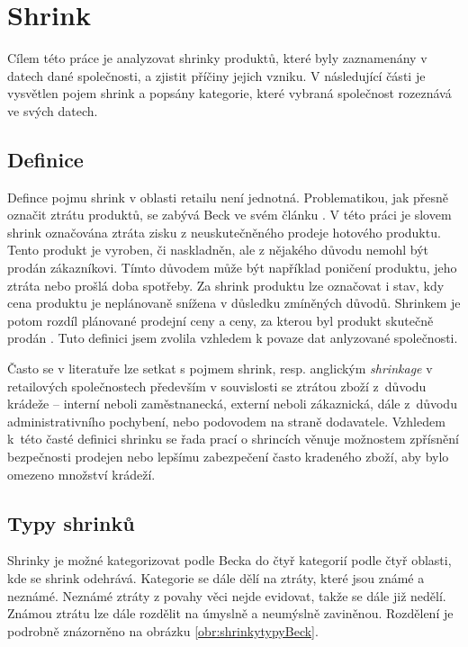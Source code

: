 \chapter{Shrink}
\label{ch:shrinky}

Cílem této práce je analyzovat shrinky produktů, které byly zaznamenány v datech dané společnosti, a zjistit příčiny jejich vzniku. V následující části je vysvětlen pojem shrink a popsány kategorie, které vybraná společnost rozeznává ve svých datech.

\section{Definice}

Defince pojmu shrink v oblasti retailu není jednotná. Problematikou, jak přesně označit ztrátu produktů, se zabývá Beck ve svém článku \cite{bib:shrink2}. V této práci je slovem shrink označována ztráta zisku z neuskutečněného prodeje hotového produktu. Tento produkt je vyroben, či naskladněn, ale z nějakého důvodu nemohl být prodán zákazníkovi. Tímto důvodem může být například poničení produktu, jeho ztráta nebo prošlá doba spotřeby. Za shrink produktu lze označovat i stav, kdy cena produktu je neplánovaně snížena v důsledku zmíněných důvodů. Shrinkem je potom rozdíl plánované prodejní ceny a ceny, za kterou byl produkt skutečně prodán \cite{bib:DefShrink}. Tuto definici jsem zvolila vzhledem k povaze dat anlyzované společnosti.

Často se v literatuře lze setkat s pojmem shrink, resp. anglickým \emph{shrinkage} v retailových společnostech především v souvislosti se ztrátou zboží z~důvodu krádeže -- interní neboli zaměstnanecká, externí neboli zákaznická, dále z~důvodu administrativního pochybení, nebo podovodem na straně dodavatele. Vzhledem k~této časté definici shrinku se řada prací o shrincích věnuje možnostem zpřísnění bezpečnosti prodejen nebo lepšímu zabezpečení často kradeného zboží, aby bylo omezeno množství krádeží.\cite{bib:shrink1,bib:shrink2}



\section{Typy shrinků}
\label{sec:shrinkyTypy}

Shrinky je možné kategorizovat podle Becka do čtyř kategorií podle čtyř oblasti, kde se shrink odehrává. Kategorie se dále dělí na ztráty, které jsou známé a neznámé. Neznámé ztráty z povahy věci nejde evidovat, takže se dále již nedělí. Známou ztrátu lze dále rozdělit na úmyslně a neumýslně zaviněnou. Rozdělení je podrobně znázorněno na obrázku \ref{obr:shrinkytypyBeck}.

